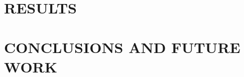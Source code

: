 \documentclass[a4paper, 10pt, conference]{ieeeconf}      %
\begin{document}
\section{RESULTS}



\section{CONCLUSIONS AND FUTURE WORK}


%
%


\end{document}
